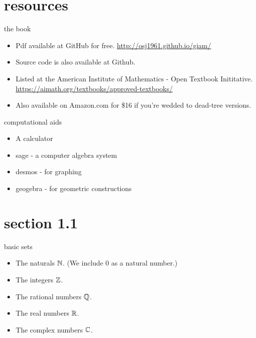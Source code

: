 \documentclass[landscape]{beamer}
\begin{document}
\section{resources} 

\begin{frame}{the book}
\begin{itemize}
\item Pdf available at GitHub for free. \href{http://osj1961.github.io/giam/}{http://osj1961.github.io/giam/} \pause
\item Source code is also available at Github.  
\item Listed at the American Institute of Mathematics - Open Textbook Inititative. \href{https://aimath.org/textbooks/approved-textbooks/}{https://aimath.org/textbooks/approved-textbooks/} \pause
\item Also available on Amazon.com for \$16 if you're wedded to dead-tree versions. 
\end{itemize}
\end{frame}

\begin{frame}{computational aids}
\begin{itemize}
\item A calculator \pause
\item sage - a computer algebra system \pause
\item desmos - for graphing \pause
\item geogebra - for geometric constructions 
\end{itemize}
\end{frame}

\section{section 1.1}

\begin{frame}{basic sets}
\begin{itemize}
\item The naturals ${\mathbb N}$. \pause 
      (We include $0$ as a natural number.) \pause
\item The integers ${\mathbb Z}$. \pause
\item The rational numbers ${\mathbb Q}$. \pause
\item The real numbers ${\mathbb R}$. \pause
\item The complex numbers ${\mathbb C}$. 
\end{itemize}
\end{frame}
\end{document}
